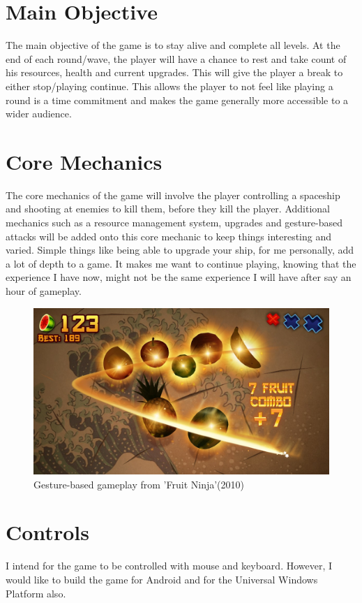 \documentclass[a4paper]{scrreprt}
\begin{document}
  \clearpage
\section{Main Objective}
The main objective of the game is to stay alive and complete all levels. At the end of each round/wave, the player will have a chance to rest and take count of his resources, health and current upgrades.
This will give the player a break to either stop/playing continue. This allows the player to not feel like playing a round is a time commitment and makes the game generally more accessible to a wider audience.



\section{Core Mechanics}
The core mechanics of the game will involve the player controlling a spaceship and shooting at enemies to kill them, before they kill the player. Additional mechanics such as a resource management system, upgrades
and gesture-based attacks will be added onto this core mechanic to keep things interesting and varied. Simple things like being able to upgrade your ship, for me personally, add a lot 
of depth to a game. It makes me want to continue playing, knowing that the experience I have now, might not be the same experience I will have after say an hour of gameplay.
\begin{figure}[h!]
  \centering
  \includegraphics[width=1\textwidth]{FruitNinja}
  \caption{Gesture-based gameplay from 'Fruit Ninja'(2010)}
  \end{figure}

\clearpage
\section{Controls}
I intend for the game to be controlled with mouse and keyboard. However, I would like to build the game for Android and for the Universal Windows Platform also.
\end{document}
